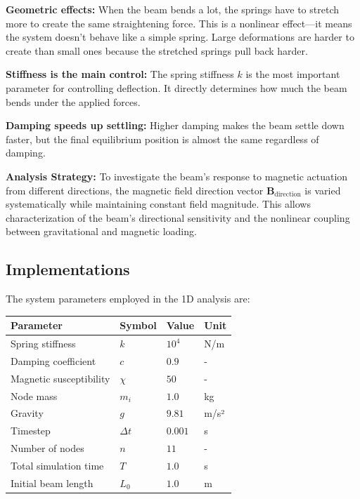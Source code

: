 \documentclass[11pt]{article}
\begin{document}
\textbf{Geometric effects:}
When the beam bends a lot, the springs have to stretch more to create the same straightening force. This is a nonlinear effect—it means the system doesn't behave like a simple spring. Large deformations are harder to create than small ones because the stretched springs pull back harder.

\textbf{Stiffness is the main control:}
The spring stiffness \(k\) is the most important parameter for controlling deflection. It directly determines how much the beam bends under the applied forces.

\textbf{Damping speeds up settling:}
Higher damping makes the beam settle down faster, but the final equilibrium position is almost the same regardless of damping.

\textbf{Analysis Strategy:} To investigate the beam's response to magnetic actuation from different directions, the magnetic field direction vector \(\mathbf{B}_{\text{direction}}\) is varied systematically while maintaining constant field magnitude. This allows characterization of the beam's directional sensitivity and the nonlinear coupling between gravitational and magnetic loading.
\subsection{Implementations}
\label{sec:org85274e8}

The system parameters employed in the 1D analysis are:

\begin{center}
\begin{tabular}{llll}
Parameter & Symbol & Value & Unit\\
\hline
Spring stiffness & \(k\) & \(10^4\) & N/m\\
Damping coefficient & \(c\) & \(0.9\) & -\\
Magnetic susceptibility & \(\chi\) & \(50\) & -\\
Node mass & \(m_i\) & \(1.0\) & kg\\
Gravity & \(g\) & \(9.81\) & m/s²\\
Timestep & \(\Delta t\) & \(0.001\) & s\\
Number of nodes & \(n\) & \(11\) & -\\
Total simulation time & \(T\) & \(1.0\) & s\\
Initial beam length & \(L_0\) & \(1.0\) & m\\
\end{tabular}
\end{center}
\end{document}
